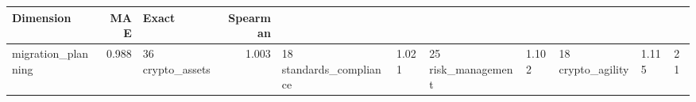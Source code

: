 \begin{tabular}{lrlr}
\toprule
Dimension & MAE & Exact & Spearman \\
\midrule
migration_planning & 0.988 & 36%
crypto_assets & 1.003 & 18%
standards_compliance & 1.021 & 25%
risk_management & 1.102 & 18%
crypto_agility & 1.115 & 21%
\bottomrule
\end{tabular}
